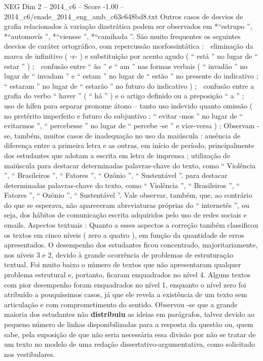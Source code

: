 \begin{textsample}{NEG Dim 2 – 2014\_c6 – Score -1.00 – 2014\_c6/enade\_2014\_eng\_amb\_c63c648bd8.txt}
Outros casos de desvios de grafia relacionados à variação diastrática podem ser observados em *“estrupo ”, *“automovís ”, *“viensse ”, *“camihada ”.
São muito frequentes os seguintes desvios de caráter ortográfico, com repercussão morfossintática :  eliminação da marca de infinitivo ( -r- ) e substituição por acento agudo ( “ está ” no lugar de “ estar ” ) ;  confusão entre “ ão ” e “ am ” nas formas verbais ( “ invadão ” no lugar de “ invadam ” e “ estam ” no lugar de “ estão ” no presente do indicativo ; “ estaram ” no lugar de “ estarão ” no futuro do indicativo ) ;  confusão entre a grafia do verbo “ haver ” ( “ há ” ) e o artigo definido ou a preposição “ a ” ;  uso de hífen para separar pronome átono – tanto uso indevido quanto omissão ( no pretérito imperfeito e futuro do subjuntivo : “ evitar -mos ” no lugar de “ evitarmos ”, “ percebesse ” no lugar de “ percebe -se ” e vice-versa ) ; Observam -se, também, muitos casos de inadequação no uso da maiúscula : ausência de diferença entre a primeira letra e as outras, em início de período, principalmente dos estudantes que adotam a escrita em letra de imprensa ; utilização de maiúscula para destacar determinadas palavras-chave do texto, como “ Violência ”, “ Brasileiros ”, “ Fatores ”, “ Ozônio ”, “ Sustentável ”. para destacar determinadas palavras-chave do texto, como “ Violência ”, “ Brasileiros ”, “ Fatores ”, “ Ozônio ”, “ Sustentável ”.
Vale observar, também, que, ao contrário do que se esperava, não apareceram abreviaturas próprias do “ internetês ”, ou seja, dos hábitos de comunicação escrita adquiridos pelo uso de redes sociais e emails.
Aspectos textuais : Quanto a esses aspectos a correção também classificou os textos em cinco níveis ( zero a quatro ), em função da quantidade de erros apresentados.
O desempenho dos estudantes ficou concentrado, majoritariamente, nos níveis 3 e 2, devido à grande ocorrência de problemas de estruturação textual.
Foi muito baixo o número de textos que não apresentaram qualquer problema estrutural e, portanto, ficaram enquadrados no nível 4.
Alguns textos com pior desempenho foram enquadrados no nível 1, enquanto o nível zero foi atribuído a pouquíssimos casos, já que ele revela a existência de um texto sem articulação e com comprometimento do sentido.
Observou -se que a grande maioria dos estudantes não \textbf{distribuiu} as ideias em parágrafos, talvez devido ao pequeno número de linhas disponibilizadas para a resposta da questão ou, quem sabe, pela suposição de que não seria necessária essa divisão por não se tratar de um texto no modelo de uma redação dissertativo-argumentativa, como solicitado nos vestibulares.

\end{textsample}
